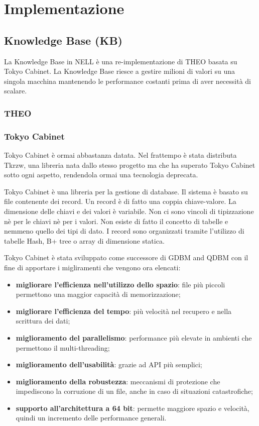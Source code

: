 \section{Implementazione}
\label{impl}
\subsection{Knowledge Base (KB)}
La Knowledge Base in NELL è una re-implementazione di THEO basata su Tokyo Cabinet. La Knowledge Base riesce a gestire milioni di valori su una singola macchina mantenendo le performance costanti prima di aver necessità di scalare\cite{TowardAnArchitecture:online}.
\subsubsection{THEO}
\cite{theofram80:online}
\subsubsection{Tokyo Cabinet}

\begin{warn}
	Tokyo Cabinet è ormai abbastanza datata. Nel frattempo è stata distributa Tkrzw, una libreria nata dallo stesso progetto ma che ha superato Tokyo Cabinet sotto ogni aspetto, rendendola ormai una tecnologia deprecata.
\end{warn}

\noindent Tokyo Cabinet è una libreria per la gestione di database. Il sistema è basato su file contenente dei record. Un record è di fatto una coppia chiave-valore. La dimensione delle chiavi e dei valori è variabile. Non ci sono vincoli di tipizzazione nè per le chiavi nè per i valori. Non esiste di fatto il concetto di tabelle e nemmeno quello dei tipi di dato. I record sono organizzati tramite l'utilizzo di tabelle Hash, B+ tree o array di dimensione statica.


\noindent Tokyo Cabinet è stata sviluppato come successore di GDBM and QDBM con il fine di apportare i migliramenti che vengono ora elencati:
\begin{itemize}
	\item \textbf{migliorare l'efficienza nell'utilizzo dello spazio}: file più piccoli permettono una maggior capacità di memorizzazione;
	\item \textbf{migliorare l'efficienza del tempo}: più velocità nel recupero e nella scrittura dei dati;
	\item \textbf{miglioramento del parallelismo}: performance più elevate in ambienti che permettono il multi-threading;
	\item \textbf{miglioramento dell'usabilità}: grazie ad API più semplici;
	\item \textbf{miglioramento della robustezza}: meccanismi di protezione che impediscono la corruzione di un file, anche in caso di situazioni catastrofiche;
	\item \textbf{supporto all'architettura a 64 bit}: permette maggiore spazio e velocità, quindi un incremento delle performance generali.
\end{itemize}

